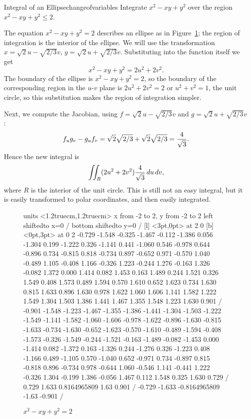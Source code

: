 \begin{example}{Integral of an Ellipse}{changeofvariables}
Integrate $x^2-xy+y^2$ over the region $x^2-xy+y^2\le 2$.
\end{example}
\begin{solution}
The equation $x^2-xy+y^2= 2$ describes an ellipse as in
Figure~\ref{fig:skewedellipse}; the region of integration is the
interior of the ellipse. We will use the transformation 
$x=\sqrt2 u-\sqrt{2/3}v$, $y=\sqrt2 u+\sqrt{2/3}v$.
Substituting into the function itself we get
\[x^2-xy+y^2=2u^2+2v^2.\]
The boundary of the ellipse is $x^2-xy+y^2=2$, so the boundary of
the corresponding region in the $u$-$v$ plane is $2u^2+2v^2=2$
or $u^2+v^2=1$, the unit circle, so this substitution makes the region
of integration simpler. 

Next, we compute the Jacobian, using $f=\sqrt2 u-\sqrt{2/3}v$ and 
$g=\sqrt2 u+\sqrt{2/3}v$:
\[f_ug_v-g_uf_v=\sqrt2\sqrt{2/3}+\sqrt2\sqrt{2/3}={4\over\sqrt3}.\]
Hence the new integral is 
\[\iint_R (2u^2+2v^2){4\over\sqrt3}\,du\,dv,\]
where $R$ is the interior of the unit circle.
This is still not an easy integral, but it is easily transformed to
polar coordinates, and then easily integrated.
\end{solution}

\begin{figure}[H]
\centerline{
\vbox{\beginpicture
\normalgraphs
\setcoordinatesystem units <1.2truecm,1.2truecm> 
\setplotarea x from -2 to 2, y from -2 to 2
\axis left shiftedto x=0 /
\axis bottom shiftedto y=0  /
 [l] <3pt,0pt> at 2 0
 [b] <0pt,3pt> at 0 2
 -0.729 -1.548 -0.325 -1.467 -0.112 -1.386 0.056 -1.304 0.199 
-1.222 0.326 -1.141 0.441 -1.060 0.546 -0.978 0.644 -0.896 0.734 
-0.815 0.818 -0.734 0.897 -0.652 0.971 -0.570 1.040 -0.489 1.105 
-0.408 1.166 -0.326 1.223 -0.244 1.276 -0.163 1.326 -0.082 1.372 
0.000 1.414 0.082 1.453 0.163 1.489 0.244 1.521 0.326 1.549 
0.408 1.573 0.489 1.594 0.570 1.610 0.652 1.623 0.734 1.630 
0.815 1.633 0.896 1.630 0.978 1.622 1.060 1.606 1.141 1.582 
1.222 1.549 1.304 1.503 1.386 1.441 1.467 1.355 1.548 1.223 
1.630 0.901 /
 -0.901 -1.548 -1.223 -1.467 -1.355 -1.386 -1.441 -1.304 -1.503 
-1.222 -1.549 -1.141 -1.582 -1.060 -1.606 -0.978 -1.622 -0.896 -1.630 
-0.815 -1.633 -0.734 -1.630 -0.652 -1.623 -0.570 -1.610 -0.489 -1.594 
-0.408 -1.573 -0.326 -1.549 -0.244 -1.521 -0.163 -1.489 -0.082 -1.453 
0.000 -1.414 0.082 -1.372 0.163 -1.326 0.244 -1.276 0.326 -1.223 
0.408 -1.166 0.489 -1.105 0.570 -1.040 0.652 -0.971 0.734 -0.897 
0.815 -0.818 0.896 -0.734 0.978 -0.644 1.060 -0.546 1.141 -0.441 
1.222 -0.326 1.304 -0.199 1.386 -0.056 1.467 0.112 1.548 0.325 
1.630 0.729 /
 0.729 1.633 0.8164965809 1.63 0.901 /
 -0.729 -1.633 -0.8164965809 -1.63 -0.901 /
\endpicture}}
\caption{$x^2-xy+y^2=2$}
\label{fig:skewedellipse}
\end{figure}

